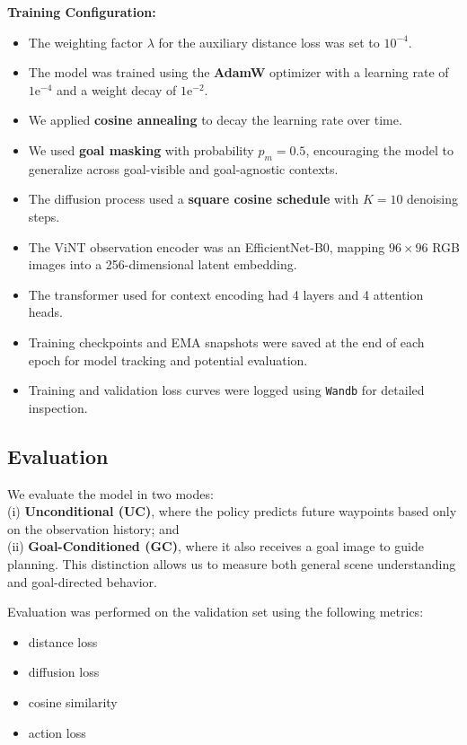 \documentclass[12pt]{article}
\begin{document}
 \textbf{Training Configuration:}
 \begin{itemize}
     \item The weighting factor $\lambda$ for the auxiliary distance loss was set to $10^{-4}$.
     \item The model was trained using the \textbf{AdamW} optimizer with a learning rate of $1\text{e}^{-4}$ and a weight decay of $1\text{e}^{-2}$.
     \item We applied \textbf{cosine annealing} to decay the learning rate over time.
     \item We used \textbf{goal masking} with probability $p_m = 0.5$, encouraging the model to generalize across goal-visible and goal-agnostic contexts.
     \item The diffusion process used a \textbf{square cosine schedule} with $K = 10$ denoising steps.
     \item The ViNT observation encoder was an EfficientNet-B0, mapping $96 \times 96$ RGB images into a 256-dimensional latent embedding.
     \item The transformer used for context encoding had 4 layers and 4 attention heads.
     \item Training checkpoints and EMA snapshots were saved at the end of each epoch for model tracking and potential evaluation.
     \item Training and validation loss curves were logged using \texttt{Wandb} for detailed inspection.
\end{itemize}
\subsection{Evaluation}
We evaluate the model in two modes:\\ 
(i) \textbf{Unconditional (UC)}, where the policy predicts future waypoints based only on the observation history; and \\
(ii) \textbf{Goal-Conditioned (GC)}, where it also receives a goal image to guide planning. This distinction allows us to measure both general scene understanding and goal-directed behavior.

Evaluation was performed on the validation set using the following metrics:
\begin{itemize}
    \item distance loss
    \item diffusion loss
    \item cosine similarity
    \item action loss
\end{itemize}
\end{document}
